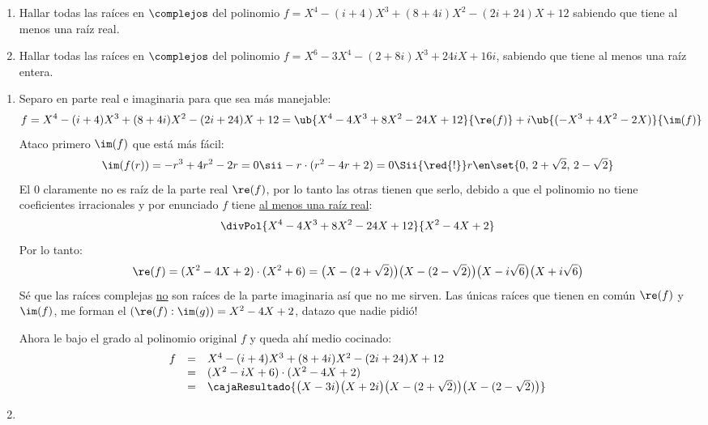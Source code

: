 \begin{enunciado}{\ejercicio}
  \begin{enumerate}[label=\roman*)]
    \item Hallar todas las raíces en $\complejos$ del polinomio
          $f = X^4 - (i + 4)X^3 + (8 + 4i)X^2 - (2i + 24)X + 12$
          sabiendo que tiene al menos una raíz real.

    \item Hallar todas las raíces en $\complejos$ del polinomio
          $f = X^6 - 3X^4 -  (2 + 8i)X^3 + 24iX + 16i$,
          sabiendo que tiene al menos una raíz entera.
  \end{enumerate}
\end{enunciado}

\begin{enumerate}[label=(\alph*)]
  \item Separo en parte real e imaginaria para que sea más manejable:
        {\small
        $$
          f = X^4 - (i + 4)X^3 + (8 + 4i)X^2 - (2i + 24)X + 12 =
          \ub{
            X^4 - 4X^3 + 8X^2 -24X + 12
          }{
            \re(f)
          }
          + i \ub{
            (-X^3 + 4X^2 -2X)
          }{
            \im(f)
          }
        $$
        }
        Ataco primero $\im(f)$ que está más fácil:
        $$
          \im(f(r)) = -r^3 + 4r^2 -2r = 0
          \sii
          -r\cdot(r^2 - 4r + 2) = 0
          \Sii{\red{!}}
          r \en \set{0,\, 2 + \sqrt{2},\, 2 - \sqrt{2}}
        $$
        El 0 claramente no es raíz de la parte real $\re(f)$, por lo tanto las otras tienen que serlo, debido a que el polinomio no tiene
        coeficientes irracionales y por enunciado $f$ tiene \ul{al menos una raíz real}:
        $$
          \divPol{X^4 - 4X^3 + 8X^2 -24X + 12}{X^2 - 4X + 2}
        $$
        Por lo tanto:
        $$
          \re(f) =  (X^2 - 4X +2) \cdot (X^2 + 6) =
          \big(X - (2 + \sqrt{2})\big)
          \big(X - (2 - \sqrt{2})\big)
          \big(X - i\sqrt{6}\big)
          \big(X + i\sqrt{6}\big)
        $$
        Sé que las raíces complejas \ul{no} son raíces de la parte imaginaria así que no me sirven. Las únicas raíces que tienen en común
        $\re(f)$ y $\im(f)$, me forman el $(\re(f): \im(g)) = X^2 - 4X + 2$, datazo que nadie pidió!

        Ahora le bajo el grado al polinomio original $f$ y queda ahí medio cocinado:
        $$
          \begin{array}{rcl}
            f & = & X^4 - (i + 4)X^3 + (8 + 4i)X^2 - (2i + 24)X + 12 \\
              & = & (X^2 - iX + 6) \cdot (X^2 - 4X + 2)              \\
              & = &
            \cajaResultado{
              \big(X - 3i\big)
              \big(X + 2i\big)
              \big(X - (2 + \sqrt{2})\big)
              \big(X - (2 - \sqrt{2})\big)
            }
          \end{array}
        $$

  \item \hacer
\end{enumerate}

\begin{aportes}
  \item {}
\end{aportes}
